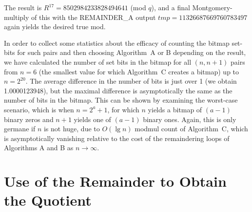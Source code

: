 \documentclass{article}
\newcommand \ra {\rightarrow}
\newcommand \oo {\infty}
\begin{document}
The result is $R^{17} = 8502984233828494641$ (mod $q$), and a final Montgomery-multiply of this with the REMAINDER\_A output $tmp = 11326687669760783497$ again yields the desired true mod.

In order to collect some statistics about the efficacy of counting the bitmap set-bits for such pairs and then choosing Algorithm~A or B depending on the result, we have calculated the number of set bits in the bitmap for all $(n,n+1)$ pairs from $n = 6$ (the smallest value for which Algorithm~C creates a bitmap) up to $n = 2^{20}$. The average difference in the number of bits is just over 1 (we obtain 1.0000123948), but the maximal difference is asymptotically the same as the number of bits in the bitmap. This can be shown by examining the worst-case scenario, which is when $n = 2^a + 1$, for which $n$ yields a bitmap of $(a-1)$ binary zeros and $n+1$ yields one of $(a-1)$ binary ones. Again, this is only germane if $n$ is not huge, due to $O(\lg n)$ modmul count of Algorithm~C, which is asymptotically vanishing relative to the cost of the remaindering loops of Algorithms A and B as $n\ra\oo$.



\section{Use of the Remainder to Obtain the Quotient}
\label{sect:algo_d}
\end{document}
